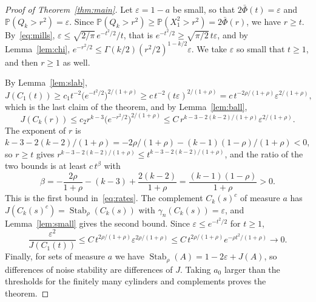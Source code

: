 \documentclass[11pt]{amsart}
\theoremstyle{remark}
\newcommand{\Prob}{\mathbb{P}}
\newcommand{\Stab}{\operatorname{Stab}_\rho}
\begin{document}
\begin{proof}[Proof of Theorem~\ref{thm:main}]
Let $\varepsilon=1-a$ be small, so that $2\bar\Phi(t)=\varepsilon$ and $\Prob(Q_k>r^2)=\varepsilon$. Since
$\Prob(Q_k>r^2)\ge\Prob(X_1^2>r^2)=2\bar\Phi(r)$, we have $r\ge t$. By~\eqref{eq:mills},
$\varepsilon\le\sqrt{2/\pi}\,e^{-t^2/2}/t$, that is $e^{-t^2/2}\ge\sqrt{\pi/2}\,t\varepsilon$, and by
Lemma~\ref{lem:chi}, $e^{-r^2/2}\le\Gamma(k/2)(r^2/2)^{1-k/2}\varepsilon$. We take $\varepsilon$ so small that $t\ge1$,
and then $r\ge1$ as well.

By Lemma~\ref{lem:slab},
\[
J(C_1(t))\ge c_1t^{-2}\bigl(e^{-t^2/2}\bigr)^{2/(1+\rho)}\ge c\,t^{-2}(t\varepsilon)^{2/(1+\rho)}
=c\,t^{-2\rho/(1+\rho)}\varepsilon^{2/(1+\rho)},
\]
which is the last claim of the theorem, and by Lemma~\ref{lem:ball},
\[
J(C_k(r))\le c_2r^{k-3}\bigl(e^{-r^2/2}\bigr)^{2/(1+\rho)}\le C\,r^{k-3-2(k-2)/(1+\rho)}\varepsilon^{2/(1+\rho)}.
\]
The exponent of $r$ is
$k-3-2(k-2)/(1+\rho)=-2\rho/(1+\rho)-(k-1)(1-\rho)/(1+\rho)<0$, so $r\ge t$ gives $r^{k-3-2(k-2)/(1+\rho)}\le
t^{k-3-2(k-2)/(1+\rho)}$, and the ratio of the two bounds is at least $c\,t^{\beta}$ with
\[
\beta=-\frac{2\rho}{1+\rho}-(k-3)+\frac{2(k-2)}{1+\rho}=\frac{(k-1)(1-\rho)}{1+\rho}>0.
\]
This is the first bound in~\eqref{eq:rates}. The complement $C_k(s)^c$ of measure $a$ has $J(C_k(s)^c)=\Stab(C_k(s))$ with
$\gamma_n(C_k(s))=\varepsilon$, and Lemma~\ref{lem:small} gives the second bound. Since $\varepsilon\le e^{-t^2/2}$ for
$t\ge1$,
\[
\frac{\varepsilon^2}{J(C_1(t))}\le C\,t^{2\rho/(1+\rho)}\varepsilon^{2\rho/(1+\rho)}\le C\,t^{2\rho/(1+\rho)}
e^{-\rho t^2/(1+\rho)}\to0 .
\]
Finally, for sets of measure $a$ we have $\Stab(A)=1-2\varepsilon+J(A)$, so differences of noise stability are
differences of $J$. Taking $a_0$ larger than the thresholds for the finitely many cylinders and complements proves the
theorem.
\end{proof}
\end{document}
